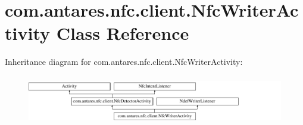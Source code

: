 \hypertarget{classcom_1_1antares_1_1nfc_1_1client_1_1_nfc_writer_activity}{\section{com.\-antares.\-nfc.\-client.\-Nfc\-Writer\-Activity Class Reference}
\label{classcom_1_1antares_1_1nfc_1_1client_1_1_nfc_writer_activity}
}
Inheritance diagram for com.\-antares.\-nfc.\-client.\-Nfc\-Writer\-Activity\-:\begin{figure}[H]
\begin{center}
\leavevmode
\includegraphics[height=2.162162cm]{classcom_1_1antares_1_1nfc_1_1client_1_1_nfc_writer_activity}
\end{center}
\end{figure}
